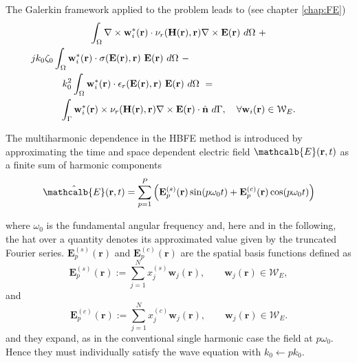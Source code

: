 The Galerkin framework applied to the problem leads to (see chapter \ref{chap:FE}) 
%
\begin{multline}
\label{eq:FEMformnl}
\int_\Omega \nabla \times \mathbf{w}_i^*(\mathbf{r}) \cdot \nu_r(\mathbf{H}(\mathbf{r}),\mathbf{r}) \nabla \times \mathbf{E}(\mathbf{r}) \ d\Omega \ + \\
 \hspace{-5cm} j k_0 \zeta_0 \int_\Omega \mathbf{w}_i^*(\mathbf{r}) \cdot \sigma(\mathbf{E}(\mathbf{r}),\mathbf{r}) \ \mathbf{E}(\mathbf{r}) \ d\Omega \ - \\
 \hspace{-3cm} k_0^2 \int_\Omega \mathbf{w}_i^*(\mathbf{r}) \cdot \epsilon_r(\mathbf{E}(\mathbf{r}),\mathbf{r}) \ \mathbf{E}(\mathbf{r}) \ d\Omega \ = \\
\int_{\Gamma} \mathbf{w}_i^*(\mathbf{r})  \times \nu_r(\mathbf{H}(\mathbf{r}),\mathbf{r}) \nabla \times {\mathbf{E}}(\mathbf{r}) \cdot \hat{\mathbf{n}} \ d\Gamma, 
\quad \forall \mathbf{w}_i(\mathbf{r}) \in \mathcal{W}_E.
\end{multline}

The multiharmonic dependence in the HBFE method is introduced by approximating the time and space dependent electric field $\mathcalb{E}(\mathbf{r},t)$ as a finite sum of harmonic components \cite{bachinger2005numerical}
%
\begin{equation} \label{eq:field}
\hat{\mathcalb{E}}(\mathbf{r}, t) = \sum^P_{p=1} \left( \mathbf{E}_{p}^{(s)}(\mathbf{r}) \sin(p
\omega_0 t) + \mathbf{E}_p^{(c)}(\mathbf{r}) \cos(p \omega_0 t) \right)
\end{equation} 

\noindent where $\omega_0$ is the fundamental angular frequency and, here and in the following, the hat over a quantity denotes its approximated value given by
the truncated Fourier series. 
$\mathbf{E}_{p}^{(s)}(\mathbf{r})$ and $\mathbf{E}_{p}^{(c)}(\mathbf{r})$ are the spatial basis functions defined as
$$
\mathbf{E}_{p}^{(s)}(\mathbf{r}) := \sum_{j=1}^{N} x_j^{(s)} \mathbf{w}_j(\mathbf{r}), \qquad \mathbf{w}_j(\mathbf{r}) \in \mathcal{W}_E,
$$ and
$$
\mathbf{E}_{p}^{(c)}(\mathbf{r}) := \sum_{j=1}^{N} x_j^{(c)} \mathbf{w}_j(\mathbf{r}), \qquad \mathbf{w}_j(\mathbf{r}) \in \mathcal{W}_E.
$$
and they expand, as in the conventional single harmonic case the field at $p\omega_0$. Hence they must individually satisfy the wave equation with $k_0 \leftarrow pk_0$.

